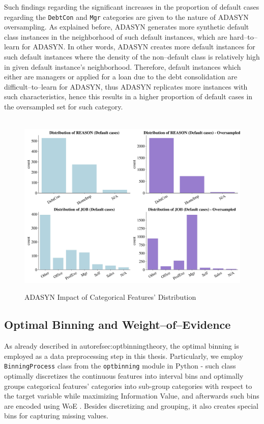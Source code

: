 Such findings regarding the significant increases in the proportion of default cases regarding the \texttt{DebtCon} and \texttt{Mgr} categories are given to the nature of ADASYN oversampling.
As explained before, ADASYN generates more synthetic default class instances in the neighborhood of such default instances, which are hard--to--learn for ADASYN.
In other words, ADASYN creates more default instances for such default instances where the density of the non--default class is relatively high in given default instance's neighborhood.
Therefore, default instances which either are managers or applied for a loan due to the debt consolidation are difficult--to--learn for ADASYN, thus ADASYN replicates more instances with such characteristics, hence this results in a higher proportion of default cases in the oversampled set for such category.


\begin{figure}[H]
    \centering
    \caption{ADASYN Impact of Categorical Features' Distribution}\vspace{0.5em}
    \label{fig:adasynimpact}\
    \includegraphics[width=140mm]{Figures/Categorical_Features_Distribution_OS_Default.jpg}
    \centering{\begin{source}Author's results in Python\end{source}}\vspace{-1em}
\end{figure}



\newpage
\subsection{Optimal Binning and Weight--of--Evidence}
\label{subsec:prep-optbinning}
As already described in autoref{sec:optbinningtheory}, the optimal binning is employed as a data preprocessing step in this thesis.
Particularly, we employ \lstinline{BinningProcess} class from the \lstinline{optbinning} module in Python - such class optimally discretizes the continuous features into interval bins and optimally groups categorical features' categories into sub-group categories with respect to the target variable while maximizing Information Value, and afterwards such bins are encoded using WoE \citep{navas2020optimal}. Besides discretizing and grouping, it also creates special bins for capturing missing values.


